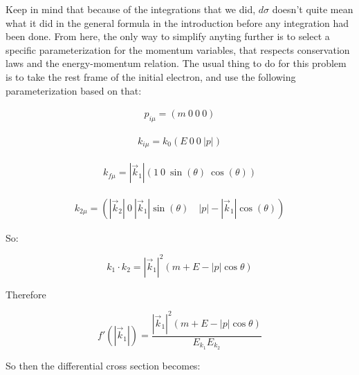 \documentclass[a4]{article}
\begin{document}
    Keep in mind that because of the integrations that we did, $d \sigma$ doesn't quite mean what it did in the general formula in the introduction before any integration had been done. From here, the only way to simplify anyting further 
    is to select a specific parameterization for the momentum variables, that respects conservation laws and the energy-momentum relation. The usual thing to do for this problem is to take the rest frame of the initial electron, and use
    the following parameterization based on that:

    \begin{equation}
        \begin{aligned}
            p_{i \mu}  = (m \: 0 \: 0 \: 0)
        \end{aligned}
    \end{equation}

    \begin{equation}
        \begin{aligned}
            k_{i \mu}  = k_0 (E \: 0 \: 0 \: |p|)
        \end{aligned}
    \end{equation}

    \begin{equation}
        \begin{aligned}
            k_{f \mu}  = |\vec{k}_1| (1 \: 0 \: \sin (\theta) \: \cos (\theta) )
        \end{aligned}
    \end{equation}

    \begin{equation}
        \begin{aligned}
            k_{2 \mu}  = (|\vec{k}_2| \: 0 \: |\vec{k}_1| \sin (\theta) \quad |p| - |\vec{k}_1| \cos (\theta) )
        \end{aligned}
    \end{equation}

    So:

    \begin{equation}
        k_1 \cdot k_2 = |\vec{k}_1|^2 (m + E - |p| \cos \theta)
    \end{equation}

    Therefore

    \begin{equation}
        f' (|\vec{k}_1|) = \frac{|\vec{k}_1|^2 (m + E - |p| \cos \theta)}{E_{k_1} E_{k_2}}
    \end{equation}

    So then the differential cross section becomes:
\end{document}
